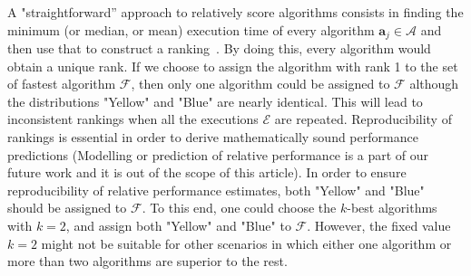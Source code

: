 \documentclass[conference]{IEEEtran}
\newcommand{\p}[1]{{\color{blue} Pdj: #1}}
\begin{document}
A "straightforward'' approach to relatively score algorithms consists in finding the minimum (or median, or mean) execution time of every algorithm $\mathbf{a}_j \in \mathcal{A}$ and then use that to construct a ranking~\cite{peise2012performance}. By doing this, every algorithm
  would obtain a unique rank. If we choose to assign the algorithm with rank 1 to the set of fastest algorithm $\mathcal{F}$, then only one algorithm could be assigned to $\mathcal{F}$ although the distributions "Yellow" and "Blue" are nearly identical. This will lead to inconsistent rankings when all the executions $\mathcal{E}$ are repeated. Reproducibility of rankings is essential in order to derive mathematically sound performance predictions (Modelling or prediction of relative performance is a part of our future work and it is out of the scope of this article).  In order to ensure reproducibility of relative performance estimates, both "Yellow" and "Blue" should be assigned to $\mathcal{F}$. 
  To this end, one could choose the $k$-best algorithms\cite{kbest-kadioglu2011algorithm} with $k=2$, and  assign both
  "Yellow" and "Blue" to $\mathcal{F}$. However, the fixed value $k=2$  might not be
  suitable for other scenarios in which either one algorithm or more than two algorithms are superior to the rest. 


\end{document}
